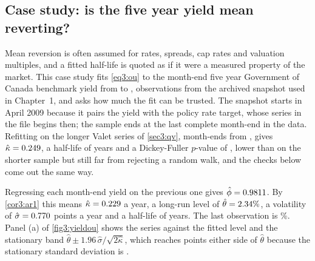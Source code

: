 \begin{chapterrefs}
\FloatBarrier
\section{Case study: is the five year yield mean reverting?}
\label{sec3:case}

Mean reversion is often assumed for rates, spreads, cap rates and valuation multiples, and a fitted
half-life is quoted as if it were a measured property of the market. This case study fits
\cref{eq3:ou} to the month-end five year Government of Canada benchmark yield from \caseStart{} to
\caseEnd, \caseN{} observations from the archived snapshot used in Chapter~1, and asks how much the fit can
be trusted. The snapshot starts in April 2009 because it pairs the yield with the policy rate
target, whose series in the file begins then; the sample ends at the last complete month-end in the
data. Refitting on the longer Valet series of \cref{sec3:qv}, \caseLongN{} month-ends from
\caseLongStart, gives $\hat\kappa=0.249$, a half-life of \caseLongHalf{} years and a
Dickey-Fuller $p$-value of \caseLongADFp, lower than on the shorter sample but still far from rejecting a random walk, and the checks below
come out the same way.

Regressing each month-end yield on the previous one gives $\hat\phi=0.9811$. By \cref{cor3:ar1} this
means $\hat\kappa=0.229$ a year, a long-run level of $\hat\theta=2.34\%$, a volatility of
$\hat\sigma=0.770$ points a year and a half-life of \caseHalf{} years. The last observation is
\caseLast\%. Panel (a) of \cref{fig3:yieldou} shows the series against the fitted level and the
stationary band $\hat\theta\pm1.96\,\hat\sigma/\sqrt{2\hat\kappa}$, which reaches \caseBand{} points either side of $\hat\theta$ because the stationary standard deviation is \caseSdInf.


\end{chapterrefs}
